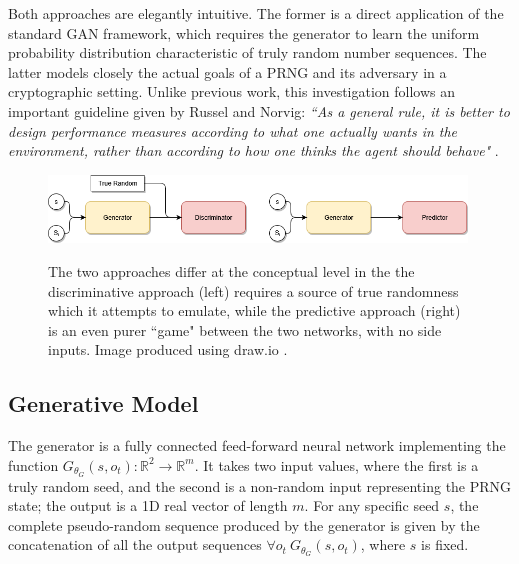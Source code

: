 \documentclass[12pt, titlepage]{report}
\theoremstyle{definition}
\begin{document}
Both approaches are elegantly intuitive. The former is a direct application of the standard GAN framework, which requires the generator to learn the uniform probability distribution characteristic of truly random number sequences. The latter models closely the actual goals of a PRNG and its adversary in a cryptographic setting. Unlike previous work, this investigation follows an important guideline given by Russel and Norvig: \textit{``As a general rule, it is better to design performance measures according to what one actually wants in the environment, rather than according to how one thinks the agent should behave"} \cite[p. 37]{russel2009artificial}.

\begin{figure}
\centering
\includegraphics[width=0.99\textwidth]{img/approach_comparison.png}\\
\caption[Discriminative approach and predictive approach]{The two approaches differ at the conceptual level in the the discriminative approach (left) requires a source of true randomness which it attempts to emulate, while the predictive approach (right) is an even purer ``game" between the two networks, with no side inputs. Image produced using draw.io \cite{jgraph2018draw}.}
\label{figure:approach_comparison}
\end{figure}



\subsection{Generative Model}
The generator is a fully connected feed-forward neural network implementing the function $G_{\theta_{G}}(s, o_t) : \mathbb{R}^2 \rightarrow \mathbb{R}^m$. It takes two input values, where the first is a truly random seed, and the second is a non-random input representing the PRNG state; the output is a 1D real vector of length $m$. For any specific seed $s$, the complete pseudo-random sequence produced by the generator is given by the concatenation of all the output sequences $\forall o_t\ G_{\theta_{G}}(s, o_t)$, where $s$ is fixed.
\end{document}
